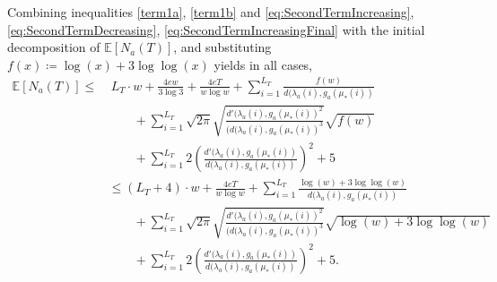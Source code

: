 \documentclass[letterpaper]{article} %
\newcommand{\bE}{\mathds{E}}
\newcommand{\defined}{\coloneqq}
\newcommand{\optMeanAtIChanges}[1]{\mu_{*}(#1)}
\newcommand{\MeanFeAtIChanges}[2]{\lambda_#1(#2)}
\newcommand{\numChanges}{L}
\newcommand{\windowsize}{w}
\begin{document}
Combining inequalities \eqref{term1a}, \eqref{term1b} and \eqref{eq:SecondTermIncreasing},\eqref{eq:SecondTermDecreasing}, \eqref{eq:SecondTermIncreasingFinal} with the initial decomposition of $\bE[N_a(T)]$, and substituting $f(x) \defined \log(x) + 3\log\log(x)$ yields in all cases, 
\begin{align}
\bE[N_a(T)] 
\leq 
& \  \numChanges_T \cdot \windowsize + \frac{4 e \windowsize}{3 \log{3}} + \frac{4 e T}{\windowsize \log{\windowsize}} +  \sum_{i=1}^{\numChanges_T} \frac{ f(\windowsize) }{d(\MeanFeAtIChanges{a}{i},g_a(\optMeanAtIChanges{i})} \nonumber \\
%
& \qquad + \sum_{i=1}^{\numChanges_T} \sqrt{2\pi}\sqrt{\frac{d'(\MeanFeAtIChanges{a}{i},g_a(\optMeanAtIChanges{i})^2}{(d(\MeanFeAtIChanges{a}{i},g_a(\optMeanAtIChanges{i})^3}}\sqrt{f(\windowsize)} \nonumber \\
%
& \qquad + \sum_{i=1}^{\numChanges_T} 2 \left(\frac{d'(\MeanFeAtIChanges{a}{i},g_a(\optMeanAtIChanges{i})}{d(\MeanFeAtIChanges{a}{i},g_a(\optMeanAtIChanges{i})}\right)^{2} + 5 \nonumber \\
%
&\leq (\numChanges_T + 4 )\cdot \windowsize + \frac{4 e T}{\windowsize \log{\windowsize}} +  \sum_{i=1}^{\numChanges_T} \frac{ \log(\windowsize) + 3\log{\log(\windowsize)}}{d(\MeanFeAtIChanges{a}{i},g_a(\optMeanAtIChanges{i})} \nonumber \\
%
& \qquad + \sum_{i=1}^{\numChanges_T} \sqrt{2\pi}\sqrt{\frac{d'(\MeanFeAtIChanges{a}{i},g_a(\optMeanAtIChanges{i})^2}{(d(\MeanFeAtIChanges{a}{i},g_a(\optMeanAtIChanges{i})^3}}\sqrt{ \log(\windowsize) + 3\log{\log(\windowsize)}} \nonumber \\
%
& \qquad + \sum_{i=1}^{\numChanges_T} 2 \left(\frac{d'(\MeanFeAtIChanges{a}{i},g_a(\optMeanAtIChanges{i})}{d(\MeanFeAtIChanges{a}{i},g_a(\optMeanAtIChanges{i})}\right)^{2} +  5. \label{eq:BoundNumberOfPlays}
\end{align}
\end{document}
